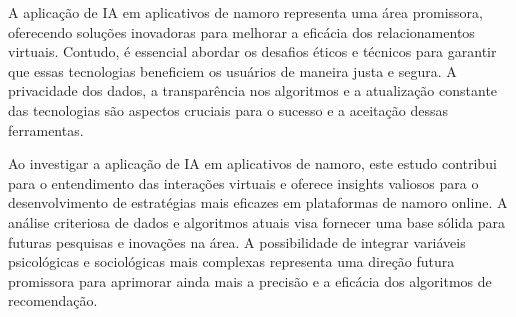 A aplicação de IA em aplicativos de namoro representa uma área promissora, oferecendo soluções inovadoras para melhorar a eficácia dos relacionamentos virtuais. Contudo, é essencial abordar os desafios éticos e técnicos para garantir que essas tecnologias beneficiem os usuários de maneira justa e segura. A privacidade dos dados, a transparência nos algoritmos e a atualização constante das tecnologias são aspectos cruciais para o sucesso e a aceitação dessas ferramentas.

Ao investigar a aplicação de IA em aplicativos de namoro, este estudo contribui para o entendimento das interações virtuais e oferece insights valiosos para o desenvolvimento de estratégias mais eficazes em plataformas de namoro online. A análise criteriosa de dados e algoritmos atuais visa fornecer uma base sólida para futuras pesquisas e inovações na área. A possibilidade de integrar variáveis psicológicas e sociológicas mais complexas representa uma direção futura promissora para aprimorar ainda mais a precisão e a eficácia dos algoritmos de recomendação.
